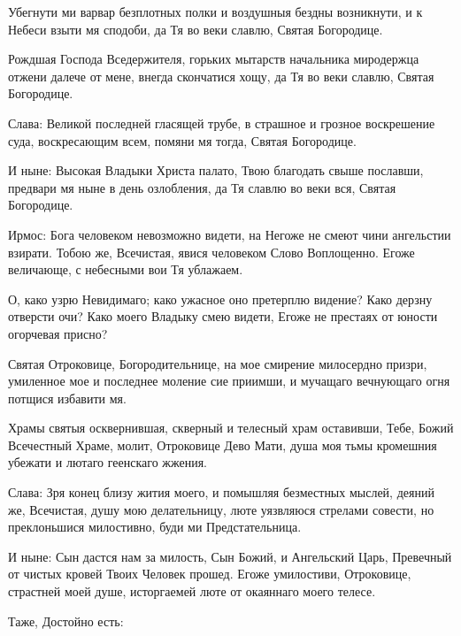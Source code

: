 Убегнути ми варвар безплотных полки и воздушныя бездны возникнути, и к Небеси взыти мя сподоби, да Тя во веки славлю, Святая Богородице.


Рождшая Господа Вседержителя, горьких мытарств начальника миродержца отжени далече от мене, внегда скончатися хощу, да Тя во веки славлю, Святая Богородице.


Слава: Великой последней гласящей трубе, в страшное и грозное воскрешение суда, воскресающим всем, помяни мя тогда, Святая Богородице.


И ныне: Высокая Владыки Христа палато, Твою благодать свыше пославши, предвари мя ныне в день озлобления, да Тя славлю во веки вся, Святая Богородице.




Ирмос: Бога человеком невозможно видети, на Негоже не смеют чини ангельстии взирати. Тобою же, Всечистая, явися человеком Слово Воплощенно. Егоже величающе, с небесными вои Тя ублажаем.


\medskip


О, како узрю Невидимаго; како ужасное оно претерплю видение? Како дерзну отверсти очи? Како моего Владыку смею видети, Егоже не престаях от юности огорчевая присно?


Святая Отроковице, Богородительнице, на мое смирение милосердно призри, умиленное мое и последнее моление сие приимши, и мучащаго вечнующаго огня потщися избавити мя.


Храмы святыя осквернившая, скверный и телесный храм оставивши, Тебе, Божий Всечестный Храме, молит, Отроковице Дево Мати, душа моя тьмы кромешния убежати и лютаго геенскаго жжения.


Слава: Зря конец близу жития моего, и помышляя безместных мыслей, деяний же, Всечистая, душу мою делательницу, люте уязвляюся стрелами совести, но преклоньшися милостивно, буди ми Предстательница.


И ныне: Сын дастся нам за милость, Сын Божий, и Ангельский Царь, Превечный от чистых кровей Твоих Человек прошед. Егоже умилостиви, Отроковице, страстней моей душе, исторгаемей люте от окаяннаго моего телесе.


Таже, Достойно есть:
\mychapterending
